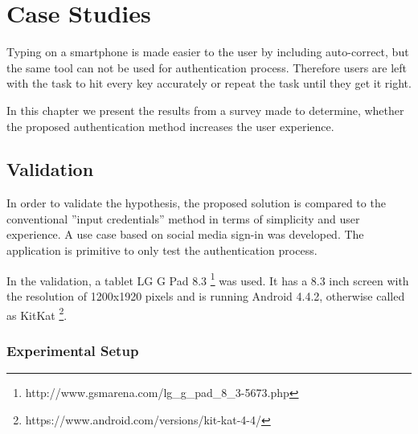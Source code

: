 
\chapter{Case Studies} %


Typing on a smartphone is made easier to the user by including auto-correct, but the same tool can not be used for authentication process. Therefore users are left with the task to hit every key accurately or repeat the task until they get it right. 

In this chapter we present the results from a survey made to determine, whether the proposed authentication method increases the user experience.



\ifpdf
    \graphicspath{{X/figures/PNG/}{X/figures/PDF/}{X/figures/}}
\else
    \graphicspath{{X/figures/EPS/}{X/figures/}}
\fi


\section{Validation}
In order to validate the hypothesis, the proposed solution is compared to the conventional ''input credentials'' method in terms of simplicity and user experience. A use case based on social media sign-in was developed. The application is primitive to only test the authentication process. 

In the validation, a tablet LG G Pad 8.3 \footnote[16]{http://www.gsmarena.com/lg\_g\_pad\_8\_3-5673.php} was used. It has a 8.3 inch screen with the resolution of 1200x1920 pixels and is running Android 4.4.2, otherwise called as KitKat \footnote[17]{https://www.android.com/versions/kit-kat-4-4/}.

\subsection{Experimental Setup}
	
